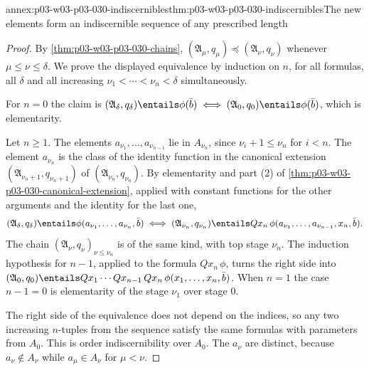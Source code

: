 \begin{annexitem}{annex:p03-w03-p03-030-indiscernibles}{thm:p03-w03-p03-030-indiscernibles}{The new elements form an indiscernible sequence of any prescribed length}
\begin{proof}
By \cref{thm:p03-w03-p03-030-chains},
\((\mathfrak A_\mu,q_\mu)\preccurlyeq(\mathfrak A_\nu,q_\nu)\) whenever
\(\mu\le\nu\le\delta\).  We prove the displayed equivalence by induction on
\(n\), for all formulas, all \(\delta\) and all increasing
\(\nu_1<\cdots<\nu_n<\delta\) simultaneously.

For \(n=0\) the claim is \((\mathfrak A_\delta,q_\delta)\entails\phi(\bar
b)\iff(\mathfrak A_0,q_0)\entails\phi(\bar b)\), which is elementarity.

Let \(n\ge1\).  The elements \(a_{\nu_1},\ldots,a_{\nu_{n-1}}\) lie in
\(A_{\nu_n}\), since \(\nu_i+1\le\nu_n\) for \(i<n\).  The element \(a_{\nu_n}\)
is the class of the identity function in the canonical extension
\((\mathfrak A_{\nu_n+1},q_{\nu_n+1})\) of \((\mathfrak A_{\nu_n},q_{\nu_n})\).
By elementarity and part (2) of
\cref{thm:p03-w03-p03-030-canonical-extension}, applied with constant
functions for the other arguments and the identity for the last one,
\[
 (\mathfrak A_\delta,q_\delta)\entails\phi(a_{\nu_1},\ldots,a_{\nu_n},\bar b)
 \iff
 (\mathfrak A_{\nu_n},q_{\nu_n})\entails
   Qx_n\,\phi(a_{\nu_1},\ldots,a_{\nu_{n-1}},x_n,\bar b).
\]
The chain \((\mathfrak A_\nu,q_\nu)_{\nu\le\nu_n}\) is of the same kind, with
top stage \(\nu_n\).  The induction hypothesis for \(n-1\), applied to the
formula \(Qx_n\,\phi\), turns the right side into \((\mathfrak A_0,q_0)\entails
Qx_1\cdots Qx_{n-1}\,Qx_n\,\phi(x_1,\ldots,x_n,\bar b)\).  When \(n=1\) the
case \(n-1=0\) is elementarity of the stage \(\nu_1\) over stage \(0\).

The right side of the equivalence does not depend on the indices, so any two
increasing \(n\)-tuples from the sequence satisfy the same formulas with
parameters from \(A_0\).  This is order indiscernibility over \(A_0\).  The
\(a_\nu\) are distinct, because \(a_\nu\notin A_\nu\) while \(a_\mu\in A_\nu\)
for \(\mu<\nu\).
\end{proof}
\end{annexitem}

